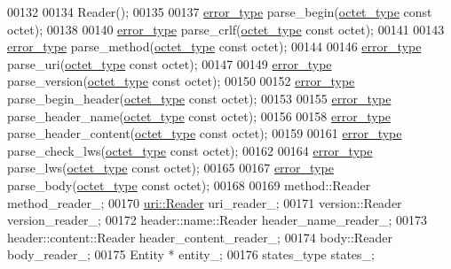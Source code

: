 \begin{DoxyCode}
00132 
00134     Reader();
00135 
00137     \hyperlink{classhryky_1_1error_1_1_holder}{error_type} parse\_begin(\hyperlink{namespacehryky_a488cba8b666be33ccca70e819684e3c8}{octet_type} \textcolor{keyword}{const} octet);
00138 
00140     \hyperlink{classhryky_1_1error_1_1_holder}{error_type} parse\_crlf(\hyperlink{namespacehryky_a488cba8b666be33ccca70e819684e3c8}{octet_type} \textcolor{keyword}{const} octet);
00141 
00143     \hyperlink{classhryky_1_1error_1_1_holder}{error_type} parse\_method(\hyperlink{namespacehryky_a488cba8b666be33ccca70e819684e3c8}{octet_type} \textcolor{keyword}{const} octet);
00144 
00146     \hyperlink{classhryky_1_1error_1_1_holder}{error_type} parse\_uri(\hyperlink{namespacehryky_a488cba8b666be33ccca70e819684e3c8}{octet_type} \textcolor{keyword}{const} octet);
00147 
00149     \hyperlink{classhryky_1_1error_1_1_holder}{error_type} parse\_version(\hyperlink{namespacehryky_a488cba8b666be33ccca70e819684e3c8}{octet_type} \textcolor{keyword}{const} octet);
00150 
00152     \hyperlink{classhryky_1_1error_1_1_holder}{error_type} parse\_begin\_header(\hyperlink{namespacehryky_a488cba8b666be33ccca70e819684e3c8}{octet_type} \textcolor{keyword}{const} octet);
00153 
00155     \hyperlink{classhryky_1_1error_1_1_holder}{error_type} parse\_header\_name(\hyperlink{namespacehryky_a488cba8b666be33ccca70e819684e3c8}{octet_type} \textcolor{keyword}{const} octet);
00156 
00158     \hyperlink{classhryky_1_1error_1_1_holder}{error_type} parse\_header\_content(\hyperlink{namespacehryky_a488cba8b666be33ccca70e819684e3c8}{octet_type} \textcolor{keyword}{const} octet);
00159 
00161     \hyperlink{classhryky_1_1error_1_1_holder}{error_type} parse\_check\_lws(\hyperlink{namespacehryky_a488cba8b666be33ccca70e819684e3c8}{octet_type} \textcolor{keyword}{const} octet);
00162 
00164     \hyperlink{classhryky_1_1error_1_1_holder}{error_type} parse\_lws(\hyperlink{namespacehryky_a488cba8b666be33ccca70e819684e3c8}{octet_type} \textcolor{keyword}{const} octet);
00165 
00167     \hyperlink{classhryky_1_1error_1_1_holder}{error_type} parse\_body(\hyperlink{namespacehryky_a488cba8b666be33ccca70e819684e3c8}{octet_type} \textcolor{keyword}{const} octet);
00168 
00169     method::Reader          method\_reader\_;
00170     \hyperlink{classhryky_1_1uri_1_1_reader}{uri::Reader}             uri\_reader\_;
00171     version::Reader         version\_reader\_;
00172     header::name::Reader    header\_name\_reader\_;
00173     header::content::Reader header\_content\_reader\_;
00174     body::Reader            body\_reader\_;
00175     Entity *                entity\_;
00176     states\_type             states\_;

\end{DoxyCode}
